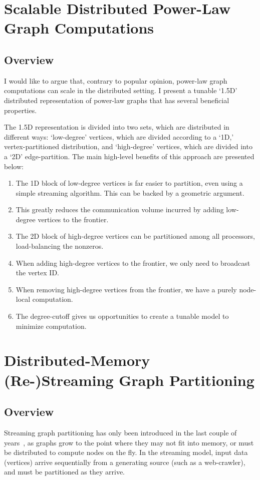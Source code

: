 \documentclass[11pt]{article}
\begin{document}
\newpage \section{Scalable Distributed Power-Law Graph Computations}
\subsection{Overview}
I would like to argue that, contrary to popular opinion, power-law graph computations can scale in the distributed setting. I present a tunable `1.5D' distributed representation of power-law graphs that has several beneficial properties.

The 1.5D representation is divided into two sets, which are distributed in different ways: `low-degree' vertices, which are divided according to a `1D,' vertex-partitioned distribution, and `high-degree' vertices, which are divided into a `2D' edge-partition. The main high-level benefits of this approach are presented below:

\begin{enumerate}
\item The 1D block of low-degree vertices is far easier to partition, even using a simple streaming algorithm. This can be backed by a geometric argument. 
\item This greatly reduces the communication volume incurred by adding low-degree vertices to the frontier.
\item The 2D block of high-degree vertices can be partitioned among all processors, load-balancing the nonzeros.
\item When adding high-degree vertices to the frontier, we only need to broadcast the vertex ID. 
\item When removing high-degree vertices from the frontier, we have a purely node-local computation.
\item The degree-cutoff gives us opportunities to create a tunable model to minimize computation.
\end{enumerate}



\newpage \section{Distributed-Memory (Re-)Streaming Graph Partitioning}
\subsection{Overview}
Streaming graph partitioning has only been introduced in the last couple of years~\cite{DBLP:journals/corr/abs-1212-1121,Stanton:2012:SGP:2339530.2339722,tsourakakis2012fennel}, as graphs grow to the point where they may not fit into memory, or must be distributed to compute nodes on the fly. In the streaming model, input data (vertices) arrive sequentially from a generating source (such as a web-crawler), and must be partitioned as they arrive.
\end{document}
